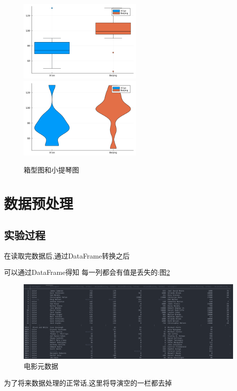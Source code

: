 \documentclass[a4paper]{article}
\begin{document}
\begin{figure}[h]
    \centering
    \includegraphics[width=6cm]{images/box.png}
    \includegraphics[width=6cm]{images/violin.png}
    \caption{箱型图和小提琴图}
    \label{fig:violin_box}
\end{figure}

\newpage

\section{数据预处理}\label{sub:pre_process}
\subsection{实验过程} \label{sub:pre_process-lab}

在读取完数据后,通过DataFrame转换之后

可以通过DataFrame得知
每一列都会有值是丢失的:图\ref{fig:movie_metadata}

\begin{figure}[h]
    \centering
    \includegraphics[width=12cm]{movie-metadata.png}
    \caption{电影元数据}
    \label{fig:movie_metadata}
\end{figure}

为了将来数据处理的正常话,这里将导演空的一栏都去掉
\end{document}
